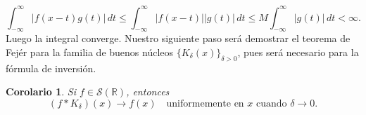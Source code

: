 \documentclass[12pt]{article}
\newcommand{\Sc}{\mathcal{S}(\mathbb{R})}
\theoremstyle{plain}
\newtheorem{corolario}[teorema]{Corolario}
\theoremstyle{definition}
\numberwithin{equation}{section}
\begin{document}
            \begin{equation*}
                \int_{-\infty}^{\infty} \left\lvert f(x-t)g(t) \right\rvert \,dt \le \int_{-\infty}^{\infty} \left\lvert f(x-t) \right\rvert \left\lvert g(t) \right\rvert \,dt \le M \int_{-\infty}^{\infty} \left\lvert g(t) \right\rvert \,dt < \infty.
            \end{equation*}
            Luego la integral converge.
            Nuestro siguiente paso será demostrar el teorema de Fejér para la familia de buenos núcleos \(\{K_\delta(x)\}_{\delta > 0}\), pues será necesario para la fórmula de inversión.
            \begin{corolario}
                \label{feje}
                Si \(f \in \Sc\), entonces 
                \begin{equation*}
                    (f * K_\delta)(x) \longrightarrow f(x) \quad \text{uniformemente en } x \text{ cuando } \delta \to 0.
                \end{equation*}
            \end{corolario}
\end{document}
